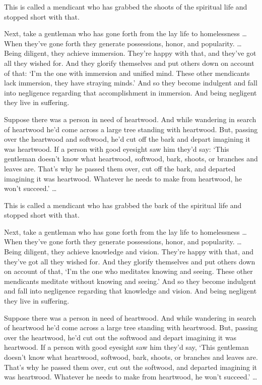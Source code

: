\documentclass[12pt,openany]{book}%
\begin{document}
This is called a mendicant who has grabbed the shoots of the spiritual life and stopped short with that. 

Next, take a gentleman who has gone forth from the lay life to homelessness … When they’ve gone forth they generate possessions, honor, and popularity. … Being diligent, they achieve immersion. They’re happy with that, and they’ve got all they wished for. And they glorify themselves and put others down on account of that: ‘I’m the one with immersion and unified mind. These other mendicants lack immersion, they have straying minds.’ And so they become indulgent and fall into negligence regarding that accomplishment in immersion. And being negligent they live in suffering. 

Suppose there was a person in need of heartwood. And while wandering in search of heartwood he’d come across a large tree standing with heartwood. But, passing over the heartwood and softwood, he’d cut off the bark and depart imagining it was heartwood. If a person with good eyesight saw him they’d say: ‘This gentleman doesn’t know what heartwood, softwood, bark, shoots, or branches and leaves are. That’s why he passed them over, cut off the bark, and departed imagining it was heartwood. Whatever he needs to make from heartwood, he won’t succeed.’ … 

This is called a mendicant who has grabbed the bark of the spiritual life and stopped short with that. 

Next, take a gentleman who has gone forth from the lay life to homelessness … When they’ve gone forth they generate possessions, honor, and popularity. … Being diligent, they achieve knowledge and vision. They’re happy with that, and they’ve got all they wished for. And they glorify themselves and put others down on account of that, ‘I’m the one who meditates knowing and seeing. These other mendicants meditate without knowing and seeing.’ And so they become indulgent and fall into negligence regarding that knowledge and vision. And being negligent they live in suffering. 

Suppose there was a person in need of heartwood. And while wandering in search of heartwood he’d come across a large tree standing with heartwood. But, passing over the heartwood, he’d cut out the softwood and depart imagining it was heartwood. If a person with good eyesight saw him they’d say, ‘This gentleman doesn’t know what heartwood, softwood, bark, shoots, or branches and leaves are. That’s why he passed them over, cut out the softwood, and departed imagining it was heartwood. Whatever he needs to make from heartwood, he won’t succeed.’ … 
\end{document}
